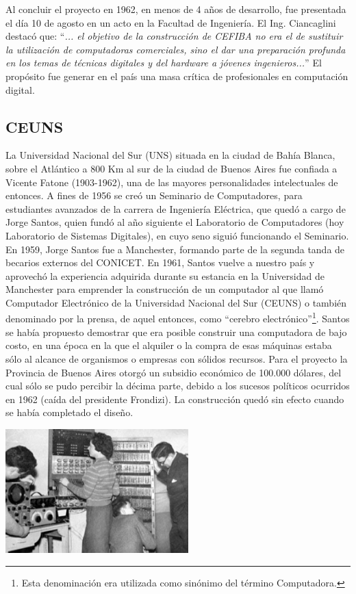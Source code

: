 \documentclass[%
  	final,
%
	notitlepage,
	narroweqnarray,
	inline,
 	twoside,
	]{ieee}
\begin{document}
Al concluir el proyecto en 1962, en menos de 4 a\~nos de desarrollo, fue presentada el d\'ia 10 de agosto en un acto en la Facultad de Ingenier\'ia. El Ing. Ciancaglini destac\'o que: ``\textit{... el objetivo de la construcci\'on de CEFIBA no era el de sustituir la utilizaci\'on de computadoras comerciales, sino el dar una preparaci\'on profunda en los temas de t\'ecnicas digitales y del hardware a j\'ovenes ingenieros...}'' El prop\'osito fue generar en el pa\'is una masa cr\'itica de profesionales en computaci\'on digital.

\subsection*{CEUNS}

La Universidad Nacional del Sur (UNS) situada en la ciudad de Bah\'ia Blanca, sobre el Atl\'antico a 800 Km al sur de la ciudad de Buenos Aires fue confiada a Vicente Fatone (1903-1962), una de las mayores personalidades intelectuales de entonces. A fines de 1956 se cre\'o un Seminario de Computadores, para estudiantes avanzados de la carrera de Ingenier\'ia El\'ectrica, que qued\'o a cargo de Jorge Santos, quien fund\'o al a\~no siguiente el Laboratorio de Computadores (hoy Laboratorio de Sistemas Digitales), en cuyo seno sigui\'o funcionando el Seminario.
En 1959, Jorge Santos fue a Manchester, formando parte de la segunda tanda de becarios externos del CONICET. En 1961, Santos vuelve a nuestro pa\'is y aprovech\'o la experiencia adquirida durante su estancia en la Universidad de Manchester para emprender la construcci\'on de un computador al que llam\'o Computador Electr\'onico de la Universidad Nacional del Sur (CEUNS) o tambi\'en denominado por la prensa, de aquel entonces, como ``cerebro electr\'onico''\footnote{Esta denominaci\'on era utilizada como sin\'onimo del t\'ermino Computadora.}. Santos se hab\'ia propuesto demostrar que era posible construir una computadora de bajo costo, en una \'epoca en la que el alquiler o la compra de esas m\'aquinas estaba s\'olo al alcance de organismos o empresas con s\'olidos recursos. Para el proyecto la Provincia de Buenos Aires otorg\'o un subsidio econ\'omico de 100.000 d\'olares, del cual s\'olo se pudo percibir la d\'ecima parte, debido a los sucesos pol\'iticos ocurridos en 1962 (ca\'ida del presidente Frondizi). La construcci\'on qued\'o sin efecto cuando se hab\'ia completado el dise\~no.

\begin{center}\includegraphics[width=200pt, height=136pt]{ceuns.png}\end{center}
\end{document}
